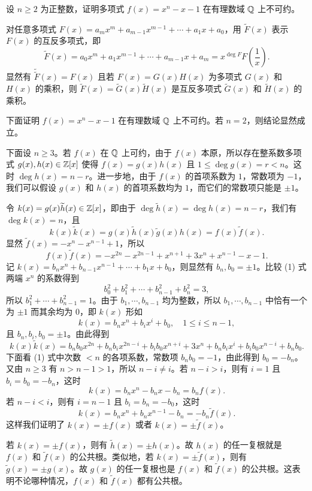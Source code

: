 设 $n\ge2$ 为正整数，证明多项式 $f(x)=x^n-x-1$ 在有理数域 $\mathbb{Q}$ 上不可约。
\begin{solution}
对任意多项式 $F(x)=a_mx^m+a_{m-1}x^{m-1}+\cdots+a_1x+a_0$，用 $\widetilde F(x)$ 表示 $F(x)$ 的互反多项式，即
\[
\widetilde F(x)=a_0x^m+a_1x^{m-1}+\cdots+a_{m-1}x+a_m=x^{\deg F}F\left(\frac1x\right).
\]
显然有 $\widetilde{\widetilde F}(x)=F(x)$ 且若 $F(x)=G(x)H(x)$ 为多项式 $G(x)$ 和 $H(x)$ 的乘积，则 $\widetilde F(x)=\widetilde G(x)\widetilde H(x)$ 是互反多项式 $\widetilde G(x)$ 和 $\widetilde H(x)$ 的乘积。

下面证明 $f(x)=x^n-x-1$ 在有理数域 $\mathbb{Q}$ 上不可约。若 $n=2$，则结论显然成立。

下面设 $n\ge3$。若 $f(x)$ 在 $\mathbb{Q}$ 上可约，由于 $f(x)$ 本原，所以存在整系数多项式 $g(x),h(x)\in\mathbb{Z}[x]$ 使得 $f(x)=g(x)h(x)$ 且 $1\le\deg g(x)=r<n$。这时 $\deg h(x)=n-r$。进一步地，由于 $f(x)$ 的首项系数为 $1$，常数项为 $-1$，我们可以假设 $g(x)$ 和 $h(x)$ 的首项系数均为 $1$，而它们的常数项只能是 $\pm1$。

令 $k(x)=g(x)\widetilde h(x)\in\mathbb{Z}[x]$，即由于 $\deg\widetilde h(x)=\deg h(x)=n-r$，我们有 $\deg k(x)=n$，且
\begin{equation}\tag{1}
k(x)\widetilde k(x)=g(x)\widetilde h(x)\widetilde g(x)h(x)=f(x)\widetilde f(x).
\end{equation}
显然 $\widetilde f(x)=-x^n-x^{n-1}+1$，所以
\[
f(x)\widetilde f(x)=-x^{2n}-x^{2n-1}+x^{n+1}+3x^n+x^{n-1}-x-1.
\]
记 $k(x)=b_nx^n+b_{n-1}x^{n-1}+\cdots+b_1x+b_0$，则显然有 $b_n,b_0=\pm1$。比较 (1) 式两端 $x^n$ 的系数得到
\[
b_0^2+b_1^2+\cdots+b_{n-1}^2+b_n^2=3,
\]
所以 $b_1^2+\cdots+b_{n-1}^2=1$。由于 $b_1,\cdots,b_{n-1}$ 均为整数，所以 $b_1,\cdots,b_{n-1}$ 中恰有一个为 $\pm1$ 而其余均为 $0$，即 $k(x)$ 形如
\[
k(x)=b_nx^n+b_ix^i+b_0,\quad 1\le i\le n-1,
\]
且 $b_n,b_i,b_0=\pm1$。由此得到
\[
k(x)\widetilde k(x)=b_nb_0x^{2n}+b_nb_ix^{2n-i}+b_ib_0x^{n+i}+3x^n+b_nb_ix^i+b_ib_0x^{n-i}+b_nb_0.
\]
下面看 (1) 式中次数 $<n$ 的各项系数，常数项 $b_nb_0=-1$，由此得到 $b_0=-b_n$。又由 $n\ge3$ 有 $n>n-1>1$，所以 $n-i\ne i$。若 $n-i>i$，则有 $i=1$ 且 $b_i=b_0=-b_n$，这时
\[
k(x)=b_nx^n-b_nx-b_n=b_nf(x).
\]
若 $n-i<i$，则有 $i=n-1$ 且 $b_i=b_n=-b_0$，这时
\[
k(x)=b_nx^n+b_nx^{n-1}-b_n=-b_n\widetilde f(x).
\]
这样我们证明了 $k(x)=\pm f(x)$ 或者 $k(x)=\pm\widetilde f(x)$。

若 $k(x)=\pm f(x)$，则有 $\widetilde h(x)=\pm h(x)$。故 $h(x)$ 的任一复根就是 $f(x)$ 和 $\widetilde f(x)$ 的公共根。类似地，若 $k(x)=\pm\widetilde f(x)$，则有 $\widetilde g(x)=\pm g(x)$。故 $g(x)$ 的任一复根也是 $f(x)$ 和 $\widetilde f(x)$ 的公共根。这表明不论哪种情况，$f(x)$ 和 $\widetilde f(x)$ 都有公共根。


\end{solution}
